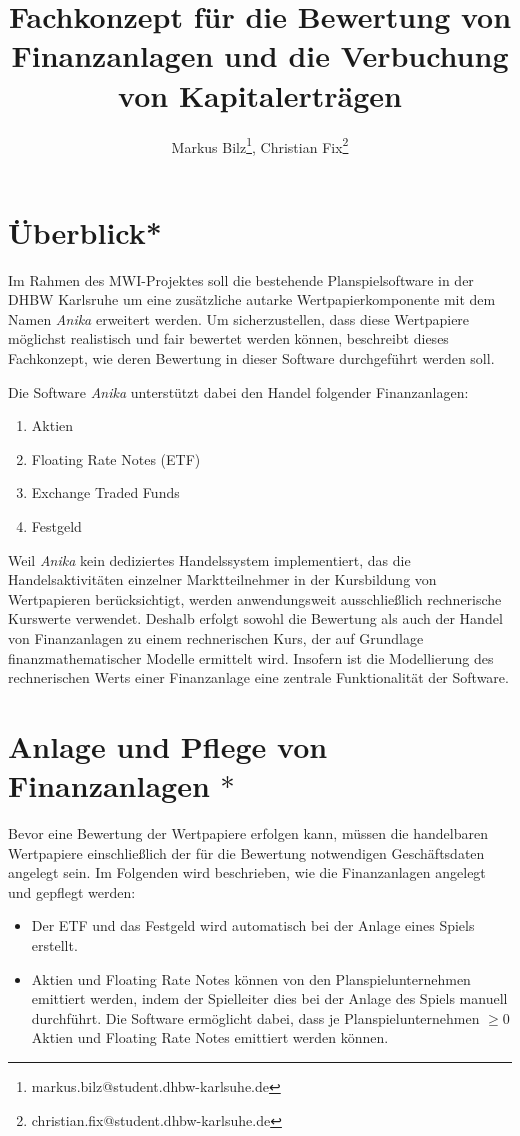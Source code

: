 \documentclass[12pt, a4paper]{article}
\title{Fachkonzept für die Bewertung von Finanzanlagen und die Verbuchung von Kapitalerträgen}
\author{Markus Bilz\thanks{markus.bilz@student.dhbw-karlsuhe.de}, Christian Fix\thanks{christian.fix@student.dhbw-karlsuhe.de}}
\begin{document}
\maketitle

\section{Überblick*}
Im Rahmen des MWI-Projektes soll die bestehende Planspielsoftware in der DHBW Karlsruhe um eine zusätzliche autarke Wertpapierkomponente mit dem Namen \textit{Anika} erweitert werden.
Um sicherzustellen, dass diese Wertpapiere möglichst realistisch und fair bewertet werden können, beschreibt dieses Fachkonzept, wie deren Bewertung in dieser Software durchgeführt werden soll.

Die Software \textit{Anika} unterstützt dabei den Handel folgender Finanzanlagen:
\begin{enumerate}
	\item Aktien
	\item Floating Rate Notes (ETF)
	\item Exchange Traded Funds
	\item Festgeld
\end{enumerate}

Weil \textit{Anika} kein dediziertes Handelssystem implementiert, das die Handelsaktivitäten einzelner Marktteilnehmer in der Kursbildung von Wertpapieren berücksichtigt, werden anwendungsweit ausschließlich rechnerische Kurswerte verwendet. 
Deshalb erfolgt sowohl die Bewertung als auch der Handel von Finanzanlagen zu einem rechnerischen Kurs, der auf Grundlage finanzmathematischer Modelle ermittelt wird.
Insofern ist die Modellierung des rechnerischen Werts einer Finanzanlage eine zentrale Funktionalität der Software.


\section{Anlage und Pflege von Finanzanlagen $\ast$}
\label{sec:anlage_und_pflege_der_wertpapiere}

Bevor eine Bewertung der Wertpapiere erfolgen kann, müssen die handelbaren Wertpapiere einschließlich der für die Bewertung notwendigen Geschäftsdaten angelegt sein. 
Im Folgenden wird beschrieben, wie die Finanzanlagen angelegt und gepflegt werden:
\begin{itemize}
	\item Der ETF und das Festgeld wird automatisch bei der Anlage eines Spiels erstellt.
	\item Aktien und Floating Rate Notes können von den Planspielunternehmen emittiert werden, indem der Spielleiter dies bei der Anlage des Spiels manuell durchführt. Die Software ermöglicht dabei, dass je Planspielunternehmen $\geq 0$ Aktien und Floating Rate Notes emittiert werden können. 
\end{itemize}
\end{document}
